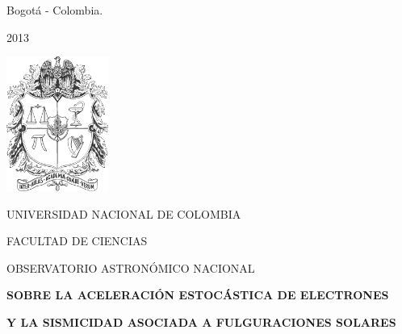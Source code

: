 \centerline{Bogot\'a - Colombia.}
\centerline{2013}
\newpage
\clearpage
\begin{center}
\includegraphics[width=0.25\textwidth]{imagenes/un.jpg}
\end{center}
\centerline{\large \sf UNIVERSIDAD NACIONAL DE COLOMBIA}
\centerline{\large \sf FACULTAD DE CIENCIAS}
\centerline{\large \sf OBSERVATORIO ASTRON\'OMICO NACIONAL} 
\vspace{2.0 cm}
{\fontsize{9}{9}\selectfont

\textcolor{2col}{\centerline{\large \bf SOBRE LA ACELERACI\'ON ESTOC\'ASTICA DE ELECTRONES}
\vspace{2.0 cm}
\centerline {\large \bf Y LA SISMICIDAD ASOCIADA A FULGURACIONES SOLARES}}}

